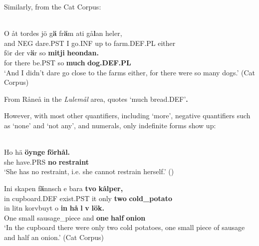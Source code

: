 \z

Similarly, from the Cat Corpus:

\ea \label{} 
\\
\gll O  åt  tordes  jö  g\textbf{ä}  fr\textbf{ä}m  ati  gå\textbf{l}an  heler,\\
and  NEG  dare.PST  I  go.INF  up  to  farm.DEF.PL  either\\
\gll för  der  v\textbf{ä}r  so  \textbf{mitji} \textbf{  heondan.}\\
for  there  be.PST  so  \textbf{much} \textbf{dog.DEF.PL}\\
\glt ‘And I didn’t dare go close to the farms either, for there were so many dogs.’ (Cat Corpus)

\z

From Råneå in the \textit{Lulemål} area, \citet[17]{Delsing2003a} quotes\textbf{ } ‘much bread.DEF’\textbf{. }

However, with most other quantifiers, including  ‘more’, negative quantifiers such as  ‘none’ and  ‘not any’, and numerals, only indefinite forms show up:

\ea\label{}
\\
\gll Ho  hä  \textbf{öynge} \textbf{förhål.}\\
she  have.PRS  \textbf{no} \textbf{restraint}\\
\glt ‘She has no restraint, i.e. she cannot restrain herself.’ (\citet{Nyström1993})

\z

\ea
\gll Ini  skapen  f\textbf{ä}nnsch  e  bara  \textbf{tvo} \textbf{  kålper,}\\
in  cupboard.DEF  exist.PST  it  only  \textbf{two} \textbf{cold\_potato}\\
\gll in  litn  korvbuyt  o  \textbf{in} \textbf{  hå} \textbf{l} \textbf{v} \textbf{  lök.}\\
One  small  sausage\_piece  and  \textbf{one} \textbf{half} \textbf{onion}\\
\glt ‘In the cupboard there were only two cold potatoes, one small piece of sausage and half an onion.’ (Cat Corpus)

\z

